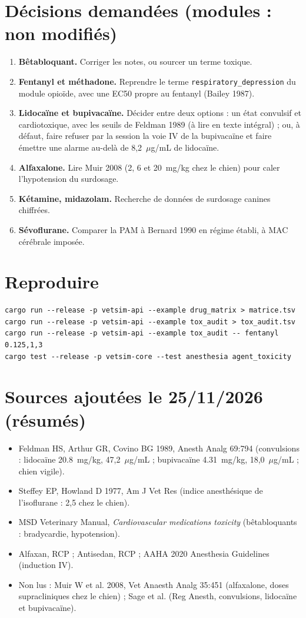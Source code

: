 \documentclass[10pt,a4paper]{article}
\newcommand{\cmd}[1]{\texttt{#1}}
\begin{document}
\section{Décisions demandées (modules : non modifiés)}

\begin{enumerate}
\item \textbf{Bêtabloquant.} Corriger les notes, ou sourcer un terme toxique.
\item \textbf{Fentanyl et méthadone.} Reprendre le terme \cmd{respiratory\_depression} du module opioïde, avec une EC50 propre au fentanyl (Bailey 1987).
\item \textbf{Lidocaïne et bupivacaïne.} Décider entre deux options : un état convulsif et cardiotoxique, avec les seuils de Feldman 1989 (à lire en texte intégral) ; ou, à défaut, faire refuser par la session la voie IV de la bupivacaïne et faire émettre une alarme au-delà de 8,2~$\mu$g/mL de lidocaïne.
\item \textbf{Alfaxalone.} Lire Muir 2008 (2, 6 et \SI{20}{mg/kg} chez le chien) pour caler l'hypotension du surdosage.
\item \textbf{Kétamine, midazolam.} Recherche de données de surdosage canines chiffrées.
\item \textbf{Sévoflurane.} Comparer la PAM à Bernard 1990 en régime établi, à MAC cérébrale imposée.
\end{enumerate}

\section{Reproduire}

\begin{verbatim}
cargo run --release -p vetsim-api --example drug_matrix > matrice.tsv
cargo run --release -p vetsim-api --example tox_audit > tox_audit.tsv
cargo run --release -p vetsim-api --example tox_audit -- fentanyl 0.125,1,3
cargo test --release -p vetsim-core --test anesthesia agent_toxicity
\end{verbatim}

\section{Sources ajoutées le 25/11/2026 (résumés)}

\begin{itemize}
\item Feldman HS, Arthur GR, Covino BG 1989, Anesth Analg 69:794 (convulsions : lidocaïne \SI{20,8}{mg/kg}, 47,2~$\mu$g/mL ; bupivacaïne \SI{4,31}{mg/kg}, 18,0~$\mu$g/mL ; chien vigile).
\item Steffey EP, Howland D 1977, Am J Vet Res (indice anesthésique de l'isoflurane : 2,5 chez le chien).
\item MSD Veterinary Manual, \emph{Cardiovascular medications toxicity} (bêtabloquants : bradycardie, hypotension).
\item Alfaxan, RCP ; Antisedan, RCP ; AAHA 2020 Anesthesia Guidelines (induction IV).
\item Non lus : Muir W et al. 2008, Vet Anaesth Analg 35:451 (alfaxalone, doses supracliniques chez le chien) ; Sage et al. (Reg Anesth, convulsions, lidocaïne et bupivacaïne).
\end{itemize}
\end{document}
